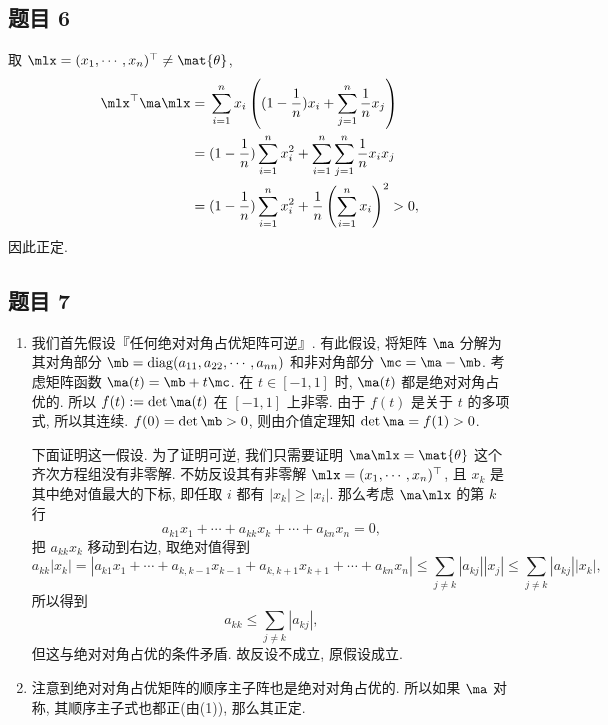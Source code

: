\subsection*{ 题目 6 }
\begin{solution}
取 $\mlx = (x_1, \cdots, x_n)^\top \not= \mat{\theta}$,
\[
\begin{aligned}
\mlx^\top \ma \mlx 
={}& \sum_{i = 1}^{n} x_i \left( (1 - \frac{1}{n}) x_i + \sum_{j = 1}^n \frac{1}{n}x_j \right) \\
={}& (1 - \frac{1}{n})\sum_{i = 1}^{n} x_i^2 + \sum_{i = 1}^{n}\sum_{j = 1}^n \frac{1}{n}x_ix_j \\
={}& (1 - \frac{1}{n})\sum_{i = 1}^{n} x_i^2 + \frac{1}{n} \left( \sum_{i = 1}^{n}x_i \right)^2 > 0,
\end{aligned}
\]
因此正定.
\end{solution}

\newpage
\subsection*{ 题目 7 }
\begin{solution}
\begin{enumerate}
    \item 我们首先假设『任何绝对对角占优矩阵可逆』. 有此假设, 将矩阵 $\ma$ 分解为其对角部分 $\mb = \mathrm{diag}(a_{11}, a_{22}, \cdots, a_{nn})$ 和非对角部分 $\mc = \ma - \mb$. 考虑矩阵函数 $\ma(t) = \mb + t\mc$. 在 $t \in [-1, 1]$ 时, $\ma(t)$ 都是绝对对角占优的. 所以 $f(t) := \det \ma(t)$ 在 $[-1, 1]$ 上非零. 由于 $f(t)$ 是关于 $t$ 的多项式, 所以其连续. $f(0) = \det \mb > 0$, 则由介值定理知 $\det \ma = f(1) > 0$.
    
    下面证明这一假设. 为了证明可逆, 我们只需要证明 $\ma\mlx = \mat{\theta}$ 这个齐次方程组没有非零解. 不妨反设其有非零解 $\mlx = (x_1, \cdots, x_n)^\top$, 且 $x_k$ 是其中绝对值最大的下标, 即任取 $i$ 都有 $|x_k| \geqslant |x_i|$. 那么考虑 $\ma \mlx$ 的第 $k$ 行
    \[
    a_{k1} x_1 + \cdots + a_{kk} x_k + \cdots + a_{kn} x_n = 0,
    \]
    把 $a_{kk} x_k$ 移动到右边, 取绝对值得到
    \[
    a_{kk} |x_k| = |a_{k1} x_1 + \cdots + a_{k, k - 1} x_{k - 1} + a_{k, k + 1} x_{k + 1} + \cdots + a_{kn} x_n| \leqslant \sum_{j \not= k} |a_{kj}| |x_j| \leqslant \sum_{j \not= k} |a_{kj}| |x_k|,
    \]
    所以得到
    \[
        a_{kk}\leqslant \sum_{j \not= k} |a_{kj}|,
    \]
    但这与绝对对角占优的条件矛盾. 故反设不成立, 原假设成立.
    \item 注意到绝对对角占优矩阵的顺序主子阵也是绝对对角占优的. 所以如果 $\ma$ 对称, 其顺序主子式也都正(由(1)), 那么其正定.
\end{enumerate}
\end{solution}

